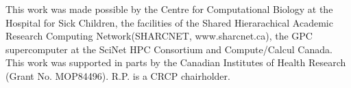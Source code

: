 

	






\acknowledgement
This work was made possible by the Centre for Computational Biology at the Hospital for Sick Children, the facilities of the Shared Hierarachical Academic Research Computing Network(SHARCNET, www.sharcnet.ca), the GPC supercomputer at the SciNet HPC Consortium and Compute/Calcul Canada. This work was supported in parts by the Canadian Institutes of Health Research (Grant No. MOP84496). R.P. is a CRCP chairholder.


% 

